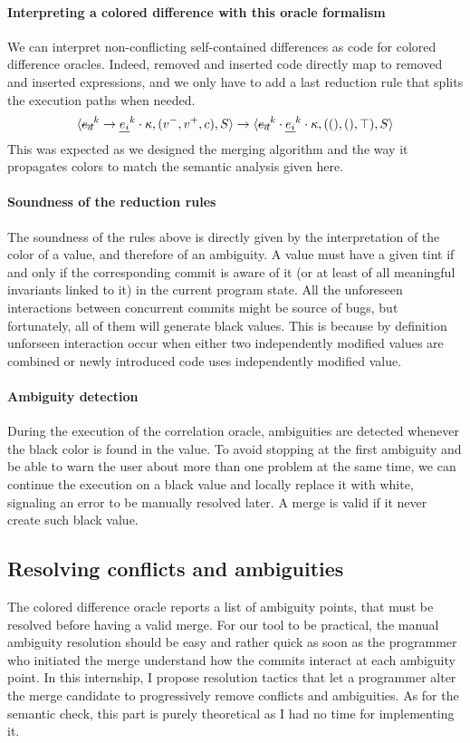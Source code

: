\documentclass[a4paper,11pt]{article}
\newcommand\mathst[1]{\text{\st{$#1$}}}
\newcommand\mathul[1]{\text{\ul{$#1$}}}
\newcommand\rtstate[3]{\langle #1, #2, #3\rangle}
\begin{document}
\paragraph{Interpreting a colored difference with this oracle formalism}
We can interpret non-conflicting self-contained differences as code for colored difference oracles.
Indeed, removed and inserted code directly map to removed and inserted expressions, and we only have to add a last reduction rule that splits the execution paths when needed.
$$\rtstate{\mathst{e_d}^k \rightarrow \mathul{e_i}^k \cdot \kappa}{(v^-, v^+, c)}{S} \rightarrow \rtstate{\mathst{e_d}^k \cdot \mathul{e_i}^k \cdot \kappa}{((), (), \top)}{S}$$
This was expected as we designed the merging algorithm and the way it propagates colors to match the semantic analysis given here.

\paragraph{Soundness of the reduction rules}
The soundness of the rules above is directly given by the interpretation of the color of a value, and therefore of an ambiguity. A value must have a given tint if and only if the corresponding commit is aware of it (or at least of all meaningful invariants linked to it) in the current program state.
All the unforeseen interactions between concurrent commits might be source of bugs, but fortunately, all of them will generate black values. This is because by definition unforseen interaction occur when either two independently modified values are combined or newly introduced code uses independently modified value.

\paragraph{Ambiguity detection}

During the execution of the correlation oracle, ambiguities are
detected whenever the black color is found in the value. To avoid
stopping at the first ambiguity and be able to warn the user about
more than one problem at the same time, we can continue the execution
on a black value and locally replace it with white, signaling an
error to be manually resolved later. A merge is valid if it never
create such black value.

\subsection{Resolving conflicts and ambiguities}
The colored difference oracle reports a list of ambiguity points, that
must be resolved before having a valid merge. For our tool to be
practical, the manual ambiguity resolution should be easy and rather
quick as soon as the programmer who initiated the merge understand how
the commits interact at each ambiguity point. In this internship, I
propose resolution tactics that let a programmer alter the merge
candidate to progressively remove conflicts and ambiguities. As for
the semantic check, this part is purely theoretical as I had no time
for implementing it.
\end{document}
